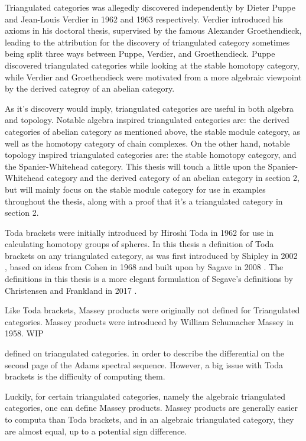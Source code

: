 Triangulated categories was allegedly discovered independently by Dieter Puppe and Jean-Louis Verdier in 1962 and 1963 respectively. Verdier introduced his axioms in his doctoral thesis, supervised by the famous Alexander Groethendieck, leading to the attribution for the discovery of triangulated category sometimes being split three ways between Puppe, Verdier, and Groethendieck. Puppe discovered triangulated categories while looking at the stable homotopy category, while Verdier and Groethendieck were motivated from a more algebraic viewpoint by the derived categroy of an abelian category.

As it's discovery would imply, triangulated categories are useful in both algebra and topology. Notable algebra inspired triangulated categories are: the derived categories of abelian category as mentioned above, the stable module category, as well as the homotopy category of chain complexes. On the other hand, notable topology inspired triangulated categories are: the stable homotopy category, and the Spanier-Whitehead category. This thesis will touch a little upon the Spanier-Whitehead category and the derived category of an abelian category in section 2, but will mainly focus on the stable module category for use in examples throughout the thesis, along with a proof that it's a triangulated category in section 2.

Toda brackets were initially introduced by Hiroshi Toda in 1962 for use in calculating homotopy groups of spheres. In this thesis a definition of Toda brackets on any triangulated category, as was first introduced by Shipley in 2002 \cite[Definition A.2]{Shipley_2002}, based on ideas from Cohen in 1968 \cite[Definition on bottom of p. 308]{Cohen_1968} and built upon by Sagave in 2008 \cite[Remark 4.5]{Sagave_2008}. The definitions in this thesis is a more elegant formulation of Segave's definitions by Christensen and Frankland in 2017 \cite[Definition 3.1]{Christensen-Frankland_2017}.

Like Toda brackets, Massey products were originally not defined for Triangulated categories. Massey products were introduced by William Schumacher Massey in 1958. WIP


defined on triangulated categories. in order to describe the differential on the second page of the Adams spectral sequence. However, a big issue with Toda brackets is the difficulty of computing them.

Luckily, for certain triangulated categories, namely the algebraic triangulated categories, one can define Massey products. Massey products are generally easier to computa than Toda brackets, and in an algebraic triangulated category, they are almost equal, up to a potential sign difference. 

